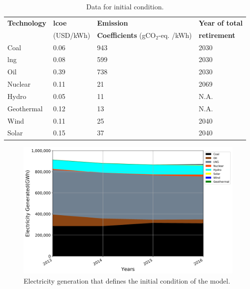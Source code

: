 \begin{table}[!ht]
	\caption{Data for initial condition.}
	\vspace{0.1in}
	\begin{tabularx}{1.2\textwidth}{p{} p{} p{} p{}}
		\hline
\textbf{Technology} & \textbf{\gls{lcoe}} & \textbf{Emission} & \textbf{Year of total}\\
  & (USD/kWh) & \textbf{Coefficients} (gCO$_2$-eq. /kWh) & \textbf{retirement} \\
\hline
Coal & 0.06 & 943 & 2030 \\
\gls{lng} & 0.08 & 599 & 2030 \\
Oil & 0.39 & 738 & 2030 \\
Nuclear & 0.11 & 21 & 2069 \\
Hydro & 0.05 & 11 & N.A. \\
Geothermal & 0.12 & 13 & N.A. \\
Wind & 0.11 & 25 & 2040 \\
Solar & 0.15 & 37 & 2040 \\
\hline 
\end{tabularx}
\label{init-eco}
\end{table}

\begin{figure}[h] 
\centering
\label{ic-elc}
\includegraphics[scale=0.5]{figures/IC}
\caption{Electricity generation that defines the initial condition of the model.}
\end{figure}

